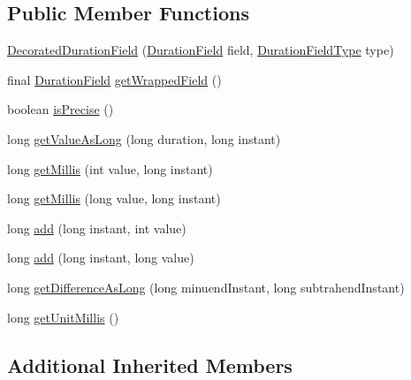 \subsection*{Public Member Functions}
\begin{DoxyCompactItemize}
\item 
\hyperlink{classorg_1_1joda_1_1time_1_1field_1_1_decorated_duration_field_ac4fc5730118b0eb261837447d6b97055}{Decorated\-Duration\-Field} (\hyperlink{classorg_1_1joda_1_1time_1_1_duration_field}{Duration\-Field} field, \hyperlink{classorg_1_1joda_1_1time_1_1_duration_field_type}{Duration\-Field\-Type} type)
\item 
final \hyperlink{classorg_1_1joda_1_1time_1_1_duration_field}{Duration\-Field} \hyperlink{classorg_1_1joda_1_1time_1_1field_1_1_decorated_duration_field_ad61e946a6749b22efa13069134e77065}{get\-Wrapped\-Field} ()
\item 
boolean \hyperlink{classorg_1_1joda_1_1time_1_1field_1_1_decorated_duration_field_a818f5570e5f790dc41a5e17885051d1f}{is\-Precise} ()
\item 
long \hyperlink{classorg_1_1joda_1_1time_1_1field_1_1_decorated_duration_field_a69f8d8828774e72ebf99a3f8ce7ff972}{get\-Value\-As\-Long} (long duration, long instant)
\item 
long \hyperlink{classorg_1_1joda_1_1time_1_1field_1_1_decorated_duration_field_afd846fe59dd2b0d44509b6f6478c8ede}{get\-Millis} (int value, long instant)
\item 
long \hyperlink{classorg_1_1joda_1_1time_1_1field_1_1_decorated_duration_field_ab940b4db255c3c5fbd971166520fd538}{get\-Millis} (long value, long instant)
\item 
long \hyperlink{classorg_1_1joda_1_1time_1_1field_1_1_decorated_duration_field_ad910cd9707cdc78df722cee6ab052e5d}{add} (long instant, int value)
\item 
long \hyperlink{classorg_1_1joda_1_1time_1_1field_1_1_decorated_duration_field_a3a4abac0db03802a068164691f63bc6a}{add} (long instant, long value)
\item 
long \hyperlink{classorg_1_1joda_1_1time_1_1field_1_1_decorated_duration_field_aefd88ed0a66d45628b224d935d391162}{get\-Difference\-As\-Long} (long minuend\-Instant, long subtrahend\-Instant)
\item 
long \hyperlink{classorg_1_1joda_1_1time_1_1field_1_1_decorated_duration_field_a9cf3cb7f3ceb0e211641d4288ca3254d}{get\-Unit\-Millis} ()
\end{DoxyCompactItemize}
\subsection*{Additional Inherited Members}


